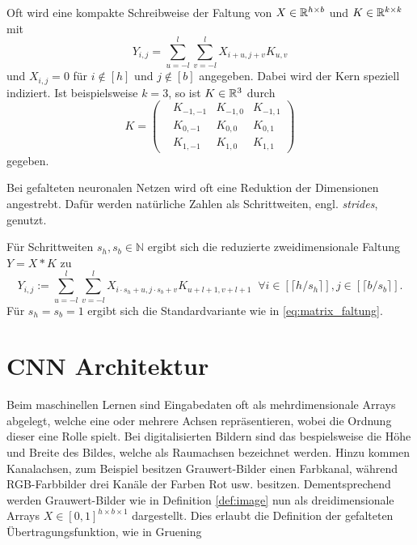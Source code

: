 \begin{bem}
    \label{bem:K_conv_komp}
    Oft wird eine kompakte Schreibweise der Faltung von $X \in \mathbb{R}^{h \times b}$ und $ K \in \mathbb{R}^{k \times k}$ mit 
    \begin{equation}
        \label{eq:valid_conv}
        Y_{i,j}=\sum_{u=-l}^l \sum_{v=-l}^l X_{i+u,j+v}K_{u,v}
    \end{equation}
    und $X_{i,j}=0$ für $i \notin [h]$ und $j \notin [b]$ angegeben. Dabei wird der Kern speziell indiziert. Ist beispielsweise $k=3$, so ist $K \in \RR^{3 \time 3}$ durch
    \begin{equation*}
        K=\begin{pmatrix}
            &K_{-1,-1} & K_{-1,0} & K_{-1,1} \\
            &K_{0,-1} & K_{0,0} & K_{0,1}  \\
            &K_{1,-1} & K_{1,0} & K_{1,1} 
        \end{pmatrix}
    \end{equation*} 
    gegeben. 
\end{bem}

Bei gefalteten neuronalen Netzen wird oft eine Reduktion der Dimensionen angestrebt. Dafür werden natürliche Zahlen als Schrittweiten, engl. \textit{strides}, genutzt.
\begin{bem}\label{bem_strides}
    Für Schrittweiten $s_h, s_b \in \mathbb{N}$ ergibt sich die reduzierte zweidimensionale Faltung $Y=X \ast K$ zu
    \begin{equation*}
        Y_{i,j}:=\sum_{u=-l}^{l} \sum_{v=-l}^{l} X_{i \cdot s_h +u,j \cdot s_b +v} K_{u+l+1, v+l+1}\; \; \forall i \in [\lceil h/s_h \rceil], j \in [\lceil b/s_b \rceil].
    \end{equation*}
    Für $s_h=s_b=1$ ergibt sich die Standardvariante wie in \ref{eq:matrix_faltung}.
    \end{bem}

\section{CNN Architektur}
\label{abs:CNN_arch}
Beim maschinellen Lernen sind Eingabedaten oft als mehrdimensionale Arrays abgelegt, welche eine oder mehrere Achsen repräsentieren, wobei die Ordnung dieser eine Rolle spielt. Bei digitalisierten Bildern sind das bespielsweise die Höhe und Breite des Bildes, welche als Raumachsen bezeichnet werden. Hinzu kommen Kanalachsen, zum Beispiel besitzen Grauwert-Bilder einen Farbkanal, während RGB-Farbbilder drei Kanäle der Farben Rot usw. besitzen. Dementsprechend werden Grauwert-Bilder wie in Definition \ref{def:image} nun als dreidimensionale Arrays $X \in [0,1]^{h \times b \times 1}$ dargestellt. Dies erlaubt die Definition der gefalteten Übertragungsfunktion, wie in Gruening\cite{gruening}

